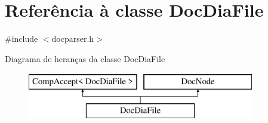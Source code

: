 \hypertarget{class_doc_dia_file}{\section{Referência à classe Doc\-Dia\-File}
\label{class_doc_dia_file}
}


{\ttfamily \#include $<$docparser.\-h$>$}

Diagrama de heranças da classe Doc\-Dia\-File\begin{figure}[H]
\begin{center}
\leavevmode
\includegraphics[height=2.000000cm]{class_doc_dia_file}
\end{center}
\end{figure}

